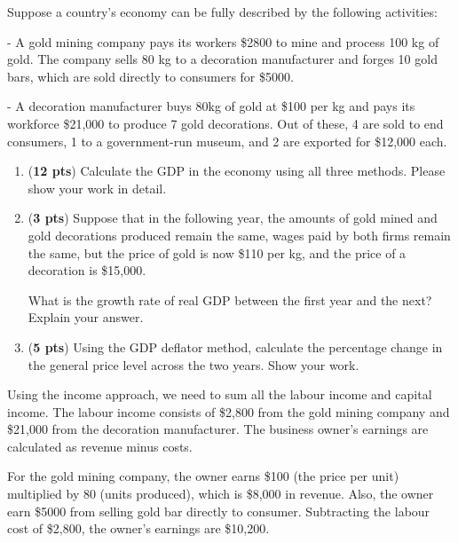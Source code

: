 \documentclass[addpoints,12pt,answers]{exam}
\begin{document}
	\vspace*{3em}
	
	
	\vspace*{3em}
	
	\begin{questions}
		
		
		\question  [20]  Suppose a country’s economy can be fully described by the following activities:
		
		- A gold mining company pays its workers \$2800 to mine and process 100 kg of gold. The company sells 80 kg to a decoration manufacturer and forges 10 gold bars, which are sold directly to consumers for \$5000.
		
		- A decoration manufacturer buys 80kg of gold at \$100 per kg and pays its workforce \$21,000 to produce 7 gold decorations. Out of these, 4 are sold to end consumers, 1 to a government-run museum, and 2 are exported for \$12,000 each.

		
		\begin{enumerate}[label=(\alph*)]
			\item (\textbf{12 pts}) Calculate the GDP in the economy using all three methods. Please show your work in detail.
			\item (\textbf{3 pts}) Suppose that in the following year, the amounts of gold mined and gold decorations produced remain the same, wages paid by both firms remain the same, but the price of gold is now \$110 per kg, and the price of a decoration is \$15,000.
			
			What is the growth rate of real GDP between the first year and the next? Explain your answer.
			\item (\textbf{5 pts}) Using the GDP deflator method, calculate the percentage change in the general price level across the two years. Show your work.
		\end{enumerate}
		
		\clearpage
		\begin{solution}
			\begin{parts}
				\item 
				Using the income approach, we need to sum all the labour income and capital income. The labour income consists of \$2,800 from the gold mining company and \$21,000 from the decoration manufacturer. The business owner's earnings are calculated as revenue minus costs. 
				
				For the gold mining company, the owner earns \$100 (the price per unit) multiplied by 80 (units produced), which is \$8,000 in revenue. Also, the owner earn \$5000 from selling gold bar directly to consumer. Subtracting the labour cost of \$2,800, the owner's earnings are \$10,200. 
				

\end{parts}
\end{solution}
\end{questions}
\end{document}
